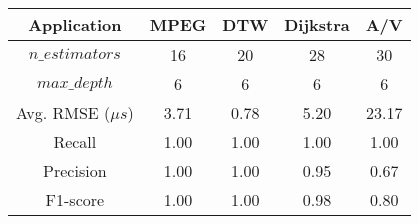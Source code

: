 \small
\begin{tabular}{|c|c|c|c|c|}
    \hline
    Application         & MPEG  & DTW   & Dijkstra & A/V   \\
    \hline
    $n\_estimators$     &  16    &  20    & 28     & 30    \\
    $max\_depth$        &   6    &   6    &  6     &  6    \\
    Avg. RMSE ($\mu s$) &   3.71 &   0.78 &  5.20  & 23.17 \\
    \hline
    Recall              &   1.00 &   1.00 &  1.00  &  1.00 \\
    Precision           &   1.00 &   1.00 &  0.95  &  0.67 \\
    F1-score            &   1.00 &   1.00 &  0.98  &  0.80 \\
    \hline
\end{tabular}

